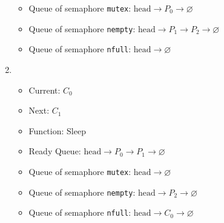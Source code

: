 \documentclass[11pt]{article}
\begin{document}
\begin{question}
\begin{enumerate}
{\begin{itemize}
{                            Ready Queue: $\text{head}\longrightarrow
                            C_{1}\longrightarrow
                            \varnothing$
                        } \item{
                            Queue of semaphore {\tt mutex}: $\text{head}\longrightarrow
                            P_{0}\longrightarrow
                            \varnothing$
                        }
                        \item{
                            Queue of semaphore {\tt nempty}: $\text{head}\longrightarrow
                            P_{1}\longrightarrow
                            P_{2}\longrightarrow
                            \varnothing$
                        }
                        \item{
                            Queue of semaphore {\tt nfull}: $\text{head}\longrightarrow
                            \varnothing$
                        }
                \end{itemize}
                }
                \item {
                    \begin{itemize}
                        \item{Current: $C_{0}$}
                        \item{Next: $C_{1}$}
                        \item{Function: Sleep}
                        \item{
                            Ready Queue: $\text{head}\longrightarrow
                            P_{0}\longrightarrow
                            P_{1}\longrightarrow
                            \varnothing$
                        } \item{
                            Queue of semaphore {\tt mutex}: $\text{head}\longrightarrow
                            \varnothing$
                        }
                        \item{
                            Queue of semaphore {\tt nempty}: $\text{head}\longrightarrow
                            P_{2}\longrightarrow
                            \varnothing$
                        }
                        \item{
                            Queue of semaphore {\tt nfull}: $\text{head}\longrightarrow
                            C_{0}\longrightarrow
                            \varnothing$
                        }
                \end{itemize}
}
\end{enumerate}
\end{question}
\end{document}
